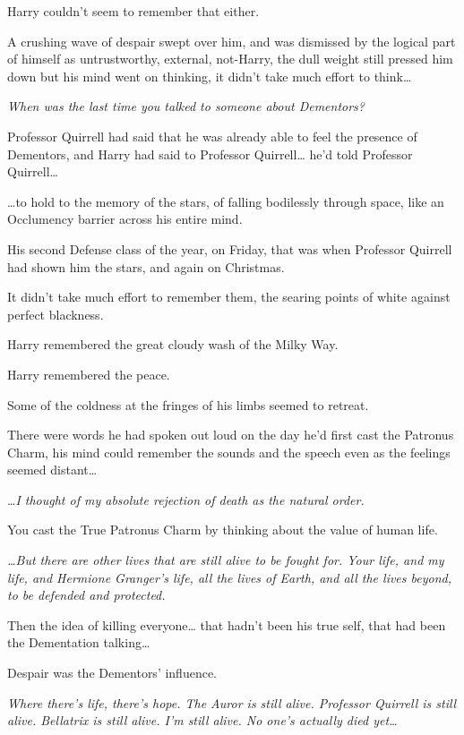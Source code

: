 Harry couldn't seem to remember that either.

A crushing wave of despair swept over him, and was dismissed by the logical 
part of himself as untrustworthy, external, not-Harry, the dull weight still 
pressed him down but his mind went on thinking, it didn't take much effort to 
think{\ldots}

\emph{When was the last time you talked to someone about Dementors?}

Professor Quirrell had said that he was already able to feel the presence of 
Dementors, and Harry had said to Professor Quirrell{\ldots} he'd told Professor 
Quirrell{\ldots}

{\ldots}to hold to the memory of the stars, of falling bodilessly through 
space, like an Occlumency barrier across his entire mind.

His second Defense class of the year, on Friday, that was when Professor 
Quirrell had shown him the stars, and again on Christmas.

It didn't take much effort to remember them, the searing points of white 
against perfect blackness.

Harry remembered the great cloudy wash of the Milky Way.

Harry remembered the peace.

Some of the coldness at the fringes of his limbs seemed to retreat.

There were words he had spoken out loud on the day he'd first cast the Patronus 
Charm, his mind could remember the sounds and the speech even as the feelings 
seemed distant{\ldots}

{\ldots}\emph{I thought of my absolute rejection of death as the natural order.}

You cast the True Patronus Charm by thinking about the value of human life.

\emph{{\ldots}But there are other lives that are still alive to be fought for. 
Your life, and my life, and Hermione Granger's life, all the lives of Earth, 
and all the lives beyond, to be defended and protected.}

Then the idea of killing everyone{\ldots} that hadn't been his true self, that 
had been the Dementation talking{\ldots}

Despair was the Dementors' influence.

\emph{Where there's life, there's hope. The Auror is still alive. Professor 
Quirrell is still alive. Bellatrix is still alive. I'm still alive. No one's 
actually died yet{\ldots}}

